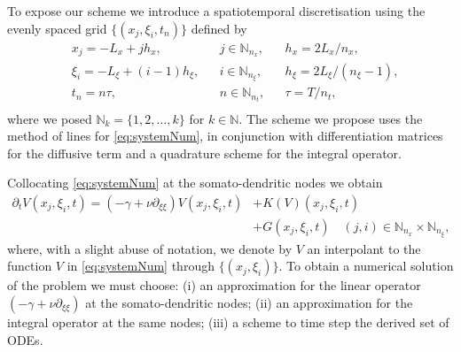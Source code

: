 \documentclass[a4paper,final]{siamart190516}
\newcommand{\Rb}{\mathbb{R}}
\newcommand{\Nb}{\mathbb{N}}
\begin{document}
To expose our scheme we introduce
a spatiotemporal discretisation 
using the evenly spaced grid 
$\{(x_j,\xi_i,t_n)\}$ defined by
\[
  \begin{aligned}
    & x_j = -L_x + j h_x, & & j \in \Nb_{n_x}, && h_x = 2L_x/n_x, \\
    & \xi_i   = -L_\xi + (i-1) h_\xi, & & i \in \Nb_{n_\xi}, && h_\xi =
    2L_\xi/(n_\xi-1), \\
    & t_n = n \tau, & & n \in \Nb_{n_t}, && \tau = T/n_t, \\
  \end{aligned}
\]
where we posed $\Nb_k = \{1,2,\ldots,k\}$ for $k \in \Nb$. The scheme we propose uses
the method of lines for \eqref{eq:systemNum}, in conjunction with differentiation
matrices for the diffusive term and a quadrature scheme for the integral operator. 


%
Collocating \eqref{eq:systemNum} at the somato-dendritic nodes we obtain
\begin{equation}\label{eq:collocation}
  \begin{split}
    \partial_t V(x_j,\xi_i,t) = (-\gamma + \nu \partial_{\xi\xi}) V(x_j,\xi_i,t) 
   & + K(V)(x_j, \xi_i,t) \\
   & + G(x_j,\xi_i,t) \quad
  (j,i) \in \Nb_{n_x} \times \Nb_{n_\xi},
  \end{split}
\end{equation}
where, with a slight abuse of notation, we denote by $V$ an interpolant to the
function $V$ in \eqref{eq:systemNum} through $\{ (x_j,\xi_i) \}$.
%
To obtain a numerical solution of the problem we
must choose: (i) an approximation for the linear operator $(-\gamma + \nu
\partial_{\xi\xi})$ at the somato-dendritic nodes; (ii) an approximation for the
integral operator at the same nodes; (iii) a scheme to time step the derived set of
ODEs. 
\end{document}
